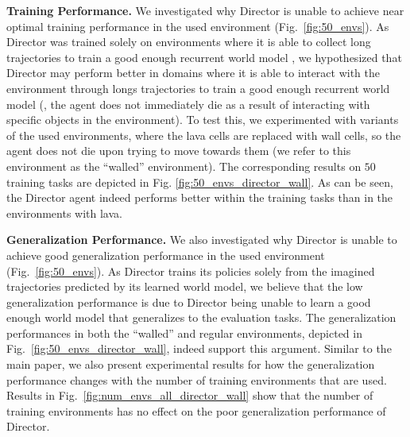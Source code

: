 \textbf{Training Performance.} We investigated why Director is unable to achieve near optimal training performance in the used environment (Fig.\ \ref{fig:50_envs}). 
As Director was trained solely on environments where it is able to collect long trajectories to train a good enough recurrent world model \citep{hafner2022deep}, we hypothesized that Director may perform better in domains where it is able to interact with the environment through longs trajectories to train a good enough recurrent world model (\ie{}, the agent does not immediately die as a result of interacting with specific objects in the environment). To test this, we experimented with variants of the used environments, where the lava cells are replaced with wall cells, so the agent does not die upon trying to move towards them (we refer to this environment as the ``walled'' environment). The corresponding results on $50$ training tasks are depicted in Fig. \ref{fig:50_envs_director_wall}. As can be seen, the Director agent indeed performs better within the training tasks than in the environments with lava. 

\textbf{Generalization Performance.} We also investigated why Director is unable to achieve good generalization performance in the used environment (Fig.\ \ref{fig:50_envs}). As Director trains its policies solely from the imagined trajectories predicted by its learned world model, we believe that the low generalization performance is due to Director being unable to learn a good enough world model that generalizes to the evaluation tasks. The generalization performances in both the ``walled'' and regular environments, depicted in Fig.\ \ref{fig:50_envs_director_wall}, indeed support this argument. Similar to the main paper, we also present experimental results for how the generalization performance changes with the number of training environments that are used. Results in Fig.\ \ref{fig:num_envs_all_director_wall} show that the number of training environments has no effect on the poor generalization performance of Director.

